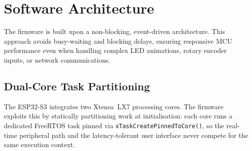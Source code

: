 \section{Software Architecture}
\label{sec:software_architecture}

The firmware is built upon a non-blocking, event-driven architecture.
This approach avoids busy-waiting and blocking delays, ensuring responsive \ac{MCU} performance even when handling complex \ac{LED} animations, rotary encoder inputs, or network communications.

\subsection{Dual-Core Task Partitioning}
\label{sec:dual_core}

The ESP32-S3 integrates two Xtensa~LX7 processing cores.
The firmware exploits this by statically partitioning work at initialisation: each core runs a dedicated FreeRTOS task pinned via \texttt{xTask\-Create\-Pinned\-To\-Core()}, so the real-time peripheral path and the latency-tolerant user interface never compete for the same execution context.

